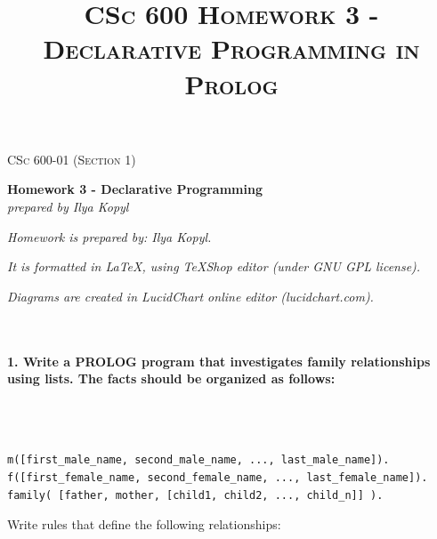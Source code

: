 \documentclass{article}
\begin{document}
	\setlength{\grammarparsep}{5pt plus 1pt minus 1pt} %
	\setlength{\grammarindent}{13em} %




	\begin{titlepage}
		\begin{center}
				\Large\textsc{CSc 600-01 (Section 1)}
				
				\Large\textbf{Homework 3 - Declarative Programming}\\

				\Large\textit{prepared by Ilya Kopyl}
				
		\end{center}	
	\end{titlepage}


	\title{\textsc{CSc 600 Homework 3 - Declarative Programming in Prolog}}	
	\maketitle
	
		\textit{Homework is prepared by: Ilya Kopyl.}

		\textit{It is formatted in LaTeX, using TeXShop editor (under GNU GPL license).}
		
		\textit{Diagrams are created in LucidChart online editor (lucidchart.com).}

	\rmfamily\




	\paragraph{1. Write a PROLOG program that investigates family relationships using lists. The facts should be organized as follows:}\
	\rmfamily\\\
	
	\ttfamily
	\begin{verbatim} 
m([first_male_name, second_male_name, ..., last_male_name]).
f([first_female_name, second_female_name, ..., last_female_name]).
family( [father, mother, [child1, child2, ..., child_n]] ).
	\end{verbatim}
	
	\rmfamily
	Write rules that define the following relationships:
	
\end{document}
